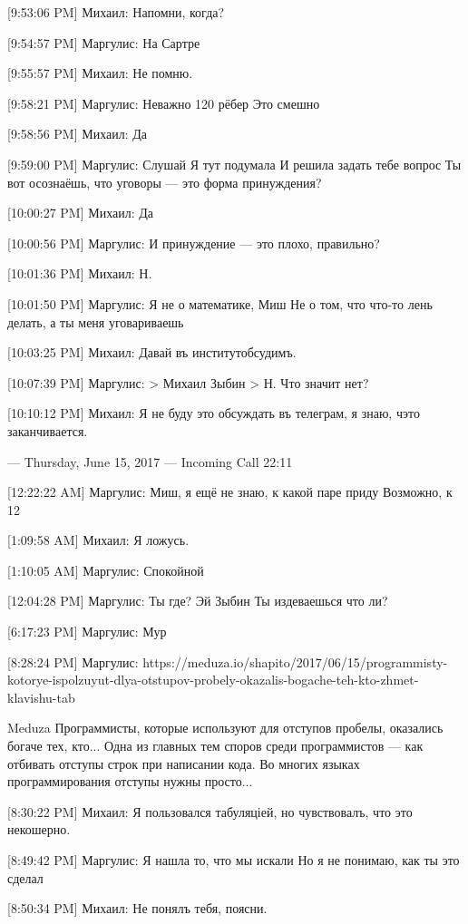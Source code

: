 \documentclass{article}
\newcommand{\yat}{{\fontencoding{X2}\selectfont\cyryat}} %
\begin{document}
[9:53:06 PM] Михаил:
Напомни, когда?

[9:54:57 PM] Маргулис:
На Сартре

[9:55:57 PM] Михаил:
Не помню.

[9:58:21 PM] Маргулис:
Неважно
 120 рёбер
 Это смешно

[9:58:56 PM] Михаил:
Да

[9:59:00 PM] Маргулис:
Слушай
 Я тут подумала
 И решила задать тебе вопрос
 Ты вот осознаёшь, что уговоры — это форма принуждения?

[10:00:27 PM] Михаил:
Да

[10:00:56 PM] Маргулис:
И принуждение — это плохо, правильно?

[10:01:36 PM] Михаил:
Н.

[10:01:50 PM] Маргулис:
Я не о математике, Миш
 Не о том, что что-то лень делать, а ты меня уговариваешь

[10:03:25 PM] Михаил:
Давай въ институт\yat обсудимъ.

[10:07:39 PM] Маргулис:
> Михаил Зыбин
> Н.
Что значит нет?

[10:10:12 PM] Михаил:
Я не буду это обсуждать въ телеграм\yat, я знаю, ч это заканчивается.

--- Thursday, June 15, 2017 ---
Incoming Call 22:11

[12:22:22 AM] Маргулис:
Миш, я ещё не знаю, к какой паре приду
 Возможно, к 12

[1:09:58 AM] Михаил:
Я ложусь.

[1:10:05 AM] Маргулис:
Спокойной

[12:04:28 PM] Маргулис:
Ты где?
 Эй
 Зыбин
 Ты издеваешься что ли?

[6:17:23 PM] Маргулис:
Мур

[8:28:24 PM] Маргулис:
https://meduza.io/shapito/2017/06/15/programmisty-kotorye-ispolzuyut-dlya-otstupov-probely-okazalis-bogache-teh-kto-zhmet-klavishu-tab

Meduza
Программисты, которые используют для отступов пробелы, оказались богаче тех, кто...
Одна из главных тем споров среди программистов — как отбивать отступы строк при написании кода. Во многих языках программирования отступы нужны просто...

[8:30:22 PM] Михаил:
Я пользовался табуляціей, но чувствовалъ, что это некошерно.

[8:49:42 PM] Маргулис:
Я нашла то, что мы искали
 Но я не понимаю, как ты это сделал

[8:50:34 PM] Михаил:
Не понялъ тебя, поясни.
\end{document}
